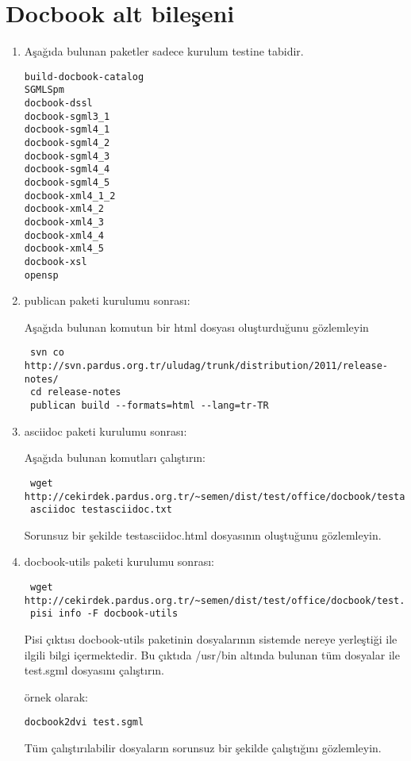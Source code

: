 \documentclass[a4paper,10pt]{article}
\begin{document}
\section{Docbook alt bileşeni}
\begin{enumerate}
 \item Aşağıda bulunan paketler sadece kurulum testine tabidir.
\begin{verbatim}
build-docbook-catalog
SGMLSpm
docbook-dssl
docbook-sgml3_1
docbook-sgml4_1
docbook-sgml4_2
docbook-sgml4_3
docbook-sgml4_4
docbook-sgml4_5
docbook-xml4_1_2
docbook-xml4_2
docbook-xml4_3
docbook-xml4_4
docbook-xml4_5
docbook-xsl
opensp
\end{verbatim}
\item publican paketi kurulumu sonrası:

Aşağıda bulunan komutun bir html dosyası oluşturduğunu gözlemleyin
\begin{verbatim}
 svn co http://svn.pardus.org.tr/uludag/trunk/distribution/2011/release-notes/
 cd release-notes
 publican build --formats=html --lang=tr-TR
\end{verbatim}

 \item asciidoc paketi kurulumu sonrası:

Aşağıda bulunan komutları çalıştırın:
\begin{verbatim}
 wget http://cekirdek.pardus.org.tr/~semen/dist/test/office/docbook/testasciidoc.txt
 asciidoc testasciidoc.txt
\end{verbatim}

Sorunsuz bir şekilde testasciidoc.html dosyasının oluştuğunu gözlemleyin.

\item docbook-utils paketi kurulumu sonrası:
\begin{verbatim}
 wget http://cekirdek.pardus.org.tr/~semen/dist/test/office/docbook/test.sgml
 pisi info -F docbook-utils
\end{verbatim}

Pisi çıktısı docbook-utils paketinin dosyalarının sistemde nereye yerleştiği ile ilgili bilgi içermektedir. Bu çıktıda /usr/bin altında bulunan tüm dosyalar ile test.sgml dosyasını çalıştırın.

örnek olarak:
\begin{verbatim}
docbook2dvi test.sgml
\end{verbatim}

Tüm çalıştırılabilir dosyaların sorunsuz bir şekilde çalıştığını gözlemleyin.


\end{enumerate}
\end{document}
